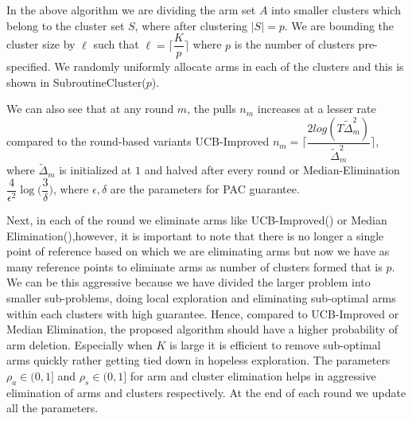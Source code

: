 In the above algorithm we are dividing the arm set $A$ into smaller clusters which belong to the cluster set $S$, where after clustering $|S|=p$. We are bounding the cluster size by $\ell$ such that $\ell=\bigg\lceil \dfrac{K}{p} \bigg\rceil$ where $p$ is the number of clusters pre-specified. We randomly uniformly allocate arms in each of the clusters and this is shown in SubroutineCluster($p$).

We can also see that at any round $m$, the pulls $n_{m}$ increases at a lesser rate compared to the round-based variants UCB-Improved $n_{m}=\bigg\lceil \dfrac{2log(T\tilde{\Delta}_{m}^{2})}{\tilde{\Delta}_{m}^{2}} \bigg\rceil$, where $\tilde{\Delta}_{m}$ is initialized at $1$ and halved after every round or Median-Elimination $\dfrac{4}{\epsilon^{2}}\log\big(\dfrac{3}{\delta}\big)$, where $\epsilon,\delta$ are the parameters for PAC guarantee.

	Next, in each of the round we eliminate arms like UCB-Improved(\cite{auer2010ucb}) or Median Elimination(\cite{even2006action}),however, it is important to note that there is no longer a single point of reference based on which we are eliminating arms but now we have as many reference points to eliminate arms as number of clusters formed that is $p$. We can be this aggressive because we have divided the larger problem into smaller sub-problems, doing local exploration and eliminating sub-optimal arms within each clusters with high guarantee. Hence, compared to UCB-Improved or Median Elimination, the proposed algorithm should have a higher probability of arm deletion. Especially when $K$ is large it is efficient to remove sub-optimal arms quickly rather getting tied down in hopeless exploration. The parameters $\rho_{a}\in (0,1]$ and $\rho_{s}\in (0,1]$ for arm and cluster elimination helps in aggressive elimination of arms and clusters respectively. At the end of each round we update all the  parameters.

